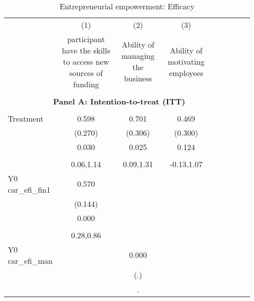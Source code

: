 \begin{table}[!h] \centering \\ \caption{Entrepreneurial empowerment: Efficacy} \\ \begin{adjustbox}{width=\columnwidth,center} \\ \begin{tabular}{l*{8}{c}} \hline\hline
                    &\multicolumn{1}{c}{(1)}         &\multicolumn{1}{c}{(2)}         &\multicolumn{1}{c}{(3)}         \\
                    &participant have the skills to access new sources of funding         &Ability of managing the business         &Ability of motivating employees         \\
\hline \\ \multicolumn{7}{c}{\textbf{Panel A: Intention-to-treat (ITT)}} \\\\[-1ex]
Treatment           &       0.598\sym{**} &       0.701\sym{**} &       0.469         \\
                    &     (0.270)         &     (0.306)         &     (0.300)         \\
                    &       0.030         &       0.025         &       0.124         \\
                    &                     &                     &                     \\
                    &   0.06,1.14         &   0.09,1.31         &  -0.13,1.07         \\
Y0 car\_efi\_fin1     &       0.570\sym{***}&                     &                     \\
                    &     (0.144)         &                     &                     \\
                    &       0.000         &                     &                     \\
                    &                     &                     &                     \\
                    &   0.28,0.86         &                     &                     \\
Y0 car\_efi\_man      &                     &       0.000         &                     \\
                    &                     &         (.)         &                     \\
                    &                     &           .         &                     \\

\end{tabular}
\end{adjustbox}
\end{table}
